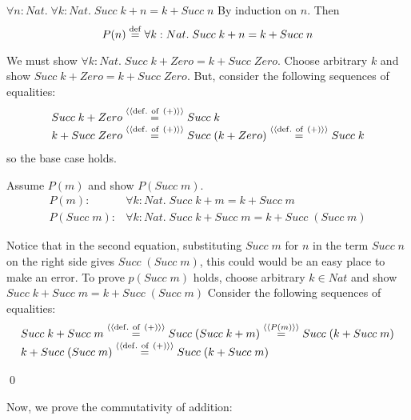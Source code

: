 \documentclass[11pt]{article}
\newcommand{\s}{{Succ\;}}
\begin{document}
\newpage

\begin{lemma}
\label{lemma2}
$\forall{}n:Nat.\;\forall{}k:Nat.\; \s k + n = k + \s n$
\Proof
By induction on $n$. Then \[P(n)\definedAs \forall{}k:Nat.\; \s k + n = k + \s n \]

\CASE[$P(Zero)$] We must show $\forall{}k:Nat.\; \s k + Zero = k + \s
Zero $. Choose arbitrary $k$ and show $\s k + Zero = k + \s Zero$.  But, consider the following sequences of equalities:
\[\begin{array}{l}
\s k + Zero \byDef{(+)} \s k \\
k + \s Zero \byDef{(+)} \s (k+ Zero) \byDef{(+)} \s k
\end{array}\]
so the base case holds.

\CASE[$P(\s m)$] Assume $P(m)$ and show $P(\s m)$.
\[\begin{array}{rl}
P(m) :& \forall{}k:Nat.\; \s k + m = k + \s m \\
P(\s m):&  \forall{}k:Nat.\; \s k + \s m = k + \s (\s m) 
\end{array}\]

Notice that in the second equation, substituting $\s m$ for $n$ in the term $\s
n$ on the right side gives $\s (\s m)$, this could would be an easy place to
make an error. To prove $p(\s m)$ holds, choose arbitrary $k\in{}Nat$ and show
$\s k + \s m = k + \s (\s m) $ Consider the following sequences of equalities:
\[\begin{array}{l}
\s k + \s m \byDef{(+)} \s(\s k + m) \byEq{P(m)} \s(k + \s m)\\ 
k + \s (\s m)  \byDef{(+)} \s(k + \s m)
\end{array}\]



\qed
\end{lemma}

Now, we prove the commutativity of addition:
\end{document}
